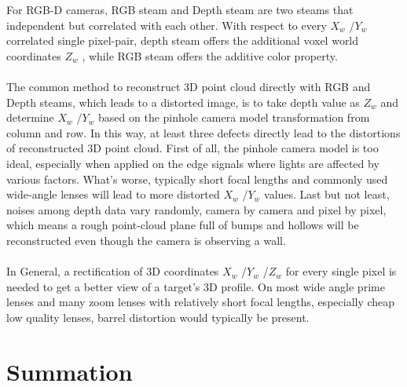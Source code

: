 For RGB-D cameras, RGB steam and Depth steam are two steams that independent but correlated with each other. With respect to every \(X_{w}\) /\(Y_{w}\)  correlated single pixel-pair, depth steam offers the additional voxel world coordinates \(Z_{w}\) , while RGB steam offers the additive color property.
\\
\\ The common method to reconstruct 3D point cloud directly with RGB and Depth steams, which leads to a distorted image, is to take depth value as \(Z_{w}\)  and determine \(X_{w}\) /\(Y_{w}\)  based on the pinhole camera model transformation from column and row. In this way, at least three defects directly lead to the distortions of reconstructed 3D point cloud. First of all, the pinhole camera model is too ideal, especially when applied on the edge signals where lights are affected by various factors. What's worse,  typically short focal lengths and commonly used wide-angle lenses will lead to more distorted \(X_{w}\) /\(Y_{w}\)  values. Last but not least, noises among depth data vary randomly, camera by camera and pixel by pixel, which means a rough point-cloud plane full of bumps and hollows will be reconstructed even though the camera is observing a wall. 
\\
\\In General, a rectification of 3D coordinates \(X_{w}\) /\(Y_{w}\) /\(Z_{w}\)  for every single pixel is needed to get a better view of a target's 3D profile. 
 On most wide angle prime lenses and many zoom lenses with relatively short focal lengths,  especially cheap low quality lenses, barrel distortion would typically be present.
 
\section{Summation}













































